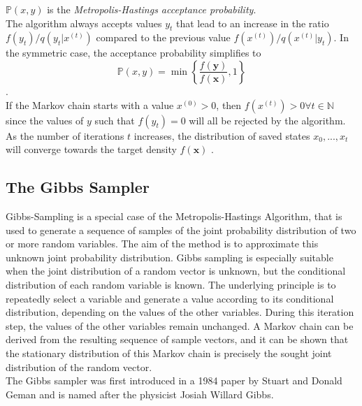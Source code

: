 $\mathbb{P}\left(x,y\right)$ is the \textit{Metropolis-Hastings acceptance probability}. \\
The algorithm always accepts values $y_t$ that lead to an increase in the ratio $f\left(y_t\right)/q\left(y_t|x^{(t)}\right)$ compared to the previous value $f\left(x^{(t)}\right)/q\left(x^{(t)}|y_t\right)$. In the symmetric case, the acceptance probability simplifies to
\begin{equation*}
     \mathbb{P}\left(x,y\right) = \min\left\lbrace\frac{f\left(\pmb{y}\right)}{f\left(\pmb{x}\right)}, 1\right\rbrace
\end{equation*}
\autocite[][]{hastings1970monte}. \\
If the Markov chain starts with a value $x^{(0)} > 0$, then $f\left(x^{(t)}\right) > 0 \forall t\in\mathbb{N}$ since the values of $y$ such that $f\left(y_t\right) = 0$ will all be rejected by the algorithm. As the number of iterations $t$ increases, the distribution of saved states $x_0,...,x_t$ will converge towards the target density $f(\pmb{x})$ \autocite[][270--275]{robert2013monte}.
\subsection{The Gibbs Sampler}
Gibbs-Sampling is a special case of the Metropolis-Hastings Algorithm, that is used to generate a sequence of samples of the joint probability distribution of two or more random variables. The aim of the method is to approximate this unknown joint probability distribution. Gibbs sampling is especially suitable when the joint distribution of a random vector is unknown, but the conditional distribution of each random variable is known. The underlying principle is to repeatedly select a variable and generate a value according to its conditional distribution, depending on the values of the other variables. During this iteration step, the values of the other variables remain unchanged. A Markov chain can be derived from the resulting sequence of sample vectors, and it can be shown that the stationary distribution of this Markov chain is precisely the sought joint distribution of the random vector. \\
The Gibbs sampler was first introduced in a 1984 paper by Stuart and Donald Geman \autocite[][]{geman1984stochastic} and is named after the physicist Josiah Willard Gibbs.
